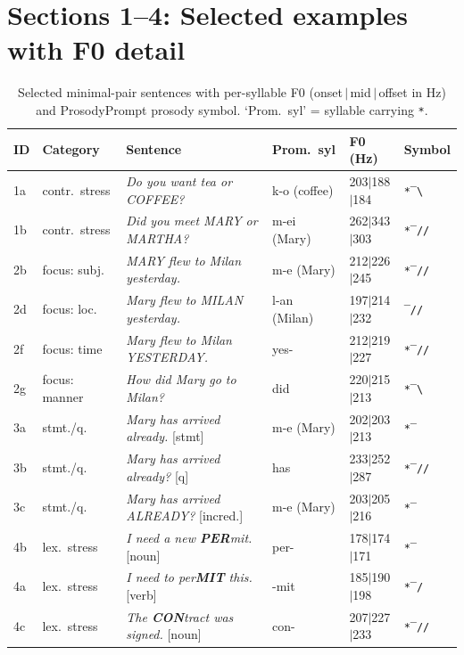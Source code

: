 \section*{Sections 1--4: Selected examples with F0 detail}

\begin{table}[h]
\centering
\caption{Selected minimal-pair sentences with per-syllable F0 (onset\,$|$\,mid\,$|$\,offset
in Hz) and ProsodyPrompt prosody symbol.
`Prom.\ syl' = syllable carrying \texttt{*}.}
\label{tab:english_selected}
\small
\begin{tabular}{llllll}
\toprule
ID & Category & Sentence & Prom.\ syl & F0 (Hz) & Symbol \\
\midrule
1a & contr.\ stress
   & \textit{Do you want tea or COFFEE?}
   & k-o (coffee)  & 203$|$188$|$184 & \texttt{*‾\textbackslash} \\
1b & contr.\ stress
   & \textit{Did you meet MARY or MARTHA?}
   & m-ei (Mary)   & 262$|$343$|$303 & \texttt{*‾//} \\
\midrule
2b & focus: subj.
   & \textit{MARY flew to Milan yesterday.}
   & m-e (Mary)    & 212$|$226$|$245 & \texttt{*‾//} \\
2d & focus: loc.
   & \textit{Mary flew to MILAN yesterday.}
   & l-an (Milan)  & 197$|$214$|$232 & \texttt{‾//} \\
2f & focus: time
   & \textit{Mary flew to Milan YESTERDAY.}
   & yes-          & 212$|$219$|$227 & \texttt{*‾//} \\
2g & focus: manner
   & \textit{How did Mary go to Milan?}
   & did           & 220$|$215$|$213 & \texttt{*‾\textbackslash} \\
\midrule
3a & stmt./q.
   & \textit{Mary has arrived already.} [stmt]
   & m-e (Mary)    & 202$|$203$|$213 & \texttt{*‾} \\
3b & stmt./q.
   & \textit{Mary has arrived already?} [q]
   & has           & 233$|$252$|$287 & \texttt{*‾//} \\
3c & stmt./q.
   & \textit{Mary has arrived ALREADY?} [incred.]
   & m-e (Mary)    & 203$|$205$|$216 & \texttt{*‾} \\
\midrule
4b & lex.\ stress
   & \textit{I need a new \textbf{PER}mit.} [noun]
   & per-          & 178$|$174$|$171 & \texttt{*‾} \\
4a & lex.\ stress
   & \textit{I need to per\textbf{MIT} this.} [verb]
   & -mit          & 185$|$190$|$198 & \texttt{*‾/} \\
4c & lex.\ stress
   & \textit{The \textbf{CON}tract was signed.} [noun]
   & con-          & 207$|$227$|$233 & \texttt{*‾//} \\
\bottomrule
\end{tabular}
\end{table}

